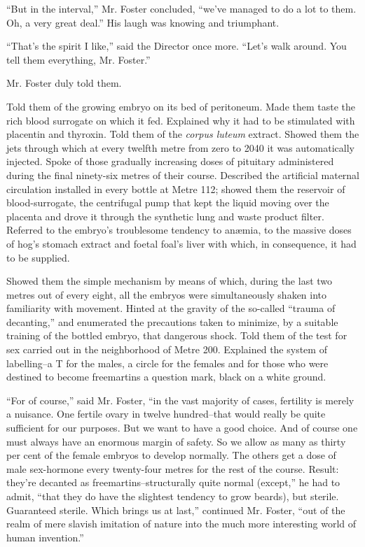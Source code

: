 \documentclass[12pt]{report}
\begin{document}
``But in the interval,'' Mr. Foster concluded, ``we've managed to do a
lot to them. Oh, a very great deal.'' His laugh was knowing and
triumphant.

``That's the spirit I like,'' said the Director once more. ``Let's walk
around. You tell them everything, Mr. Foster.''

Mr. Foster duly told them.

Told them of the growing embryo on its bed of peritoneum. Made them
taste the rich blood surrogate on which it fed. Explained why it had to
be stimulated with placentin and thyroxin. Told them of the \emph{corpus
luteum} extract. Showed them the jets through which at every twelfth
metre from zero to 2040 it was automatically injected. Spoke of those
gradually increasing doses of pituitary administered during the final
ninety-six metres of their course. Described the artificial maternal
circulation installed in every bottle at Metre 112; showed them the
reservoir of blood-surrogate, the centrifugal pump that kept the liquid
moving over the placenta and drove it through the synthetic lung and
waste product filter. Referred to the embryo's troublesome tendency to
anæmia, to the massive doses of hog's stomach extract and foetal foal's
liver with which, in consequence, it had to be supplied.

Showed them the simple mechanism by means of which, during the last two
metres out of every eight, all the embryos were simultaneously shaken
into familiarity with movement. Hinted at the gravity of the so-called
``trauma of decanting,'' and enumerated the precautions taken to
minimize, by a suitable training of the bottled embryo, that dangerous
shock. Told them of the test for sex carried out in the neighborhood of
Metre 200. Explained the system of labelling--a T for the males, a
circle for the females and for those who were destined to become
freemartins a question mark, black on a white ground.

``For of course,'' said Mr. Foster, ``in the vast majority of cases,
fertility is merely a nuisance. One fertile ovary in twelve
hundred--that would really be quite sufficient for our purposes. But we
want to have a good choice. And of course one must always have an
enormous margin of safety. So we allow as many as thirty per cent of the
female embryos to develop normally. The others get a dose of male
sex-hormone every twenty-four metres for the rest of the course. Result:
they're decanted as freemartins--structurally quite normal (except,'' he
had to admit, ``that they do have the slightest tendency to grow
beards), but sterile. Guaranteed sterile. Which brings us at last,''
continued Mr. Foster, ``out of the realm of mere slavish imitation of
nature into the much more interesting world of human invention.''
\end{document}
